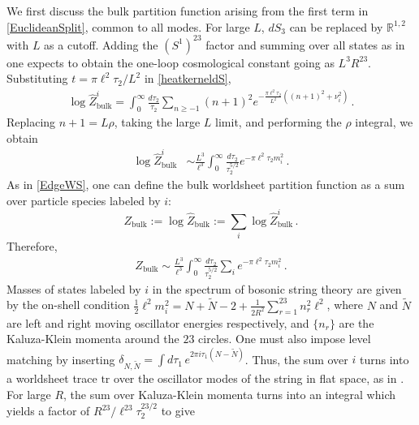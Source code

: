 \documentclass[aps,prl, reprint, superscriptaddress, 10pt]{revtex4-2}
\newcommand{\1}{\textbf{1}}
\newcommand{\tr}{\mbox{tr}}
\newcommand{\+}{{\,+ \,}}
\begin{document}
We first discuss the bulk partition function arising from the first term in \eqref{EuclideanSplit}, common to all modes. For large $L$, $dS_3$ can be replaced by $\mathbb{R}^{1,2}$ with $L$ as a cutoff. Adding the $(S^1)^{23}$ factor and summing over all states as in \cite{Polchinski:1985zf} one expects to obtain the one-loop cosmological constant going as $L ^3 R^{23}$. Substituting $t = \pi \ell^2 \tau_2/L^2$ in \eqref{heatkerneldS},
\begin{equation}
\begin{split}
	\log\hat Z_{\text{bulk}}^i = \int_0^\infty \frac{d\tau_2}{\tau_2} \sum_{n\geq -1}
	( n+ 1)^2 e^{- \frac{ \pi \ell^2 \tau_2}{L^2} \left( \left( n + 1\right)^2 + \nu_i^2 \right)} \, .
\end{split}
\end{equation}
Replacing $n+1= L \rho $, taking the large $L$ limit, and performing the $\rho$ integral, we obtain
\begin{equation} \label{flatspdS}
\begin{split}
	\log \hat{Z}_{\text{bulk}}^i &\sim \frac{L^3}{\ell^3 }
	\int_0^\infty \frac{d\tau_2}{\tau_2^{5/2}} e^{- \pi \ell^2 \tau_2 m_i^2 } \, .
\end{split}
\end{equation}
As in \eqref{EdgeWS}, one can define the bulk worldsheet partition function as a sum over particle species labeled by $i$:
\begin{equation}
	Z_{\text{bulk}} := \log \hat{Z}_{\text{bulk}} := \sum_i \log \hat{Z}_{\text{bulk}}^i \, .
\end{equation}
Therefore,
\begin{equation}
	\begin{split}
	Z_{\text{bulk}} \sim \frac{L^{3}}{ \ell^{ 3} } \int_0^\infty \frac{d\tau_2}{\tau_2^{5/2}} \sum_i e^{ - \pi \ell^2\tau_2 m_i^2} \, .
	\end{split}
\end{equation}
Masses of states labeled by $i$ in the spectrum of bosonic string theory are given by the on-shell condition $\frac{1}{2} \ell^2 m_i^2= N + \tilde N - 2 + \frac{1}{2R^2} \sum_{r=1}^{23} n_r^2 \ell^2$, where $N$ and $\tilde N$ are left and right moving oscillator energies respectively, and $\{n_r\} $ are the Kaluza-Klein momenta around the $23$ circles. One must also impose level matching by inserting $\delta_{N,\tilde N} = \int d\tau_1 \, e^{2 \pi i \tau_1 (N - \tilde N) }$. Thus, the sum over $i$ turns into a worldsheet trace $\tr$ over the oscillator modes of the string in flat space, as in \cite{Polchinski:1985zf}. For large $R$, the sum over Kaluza-Klein momenta turns into an integral which yields a factor of $R^{23}/\ell^{23}\tau_2^{23/2}$ to give
\end{document}
